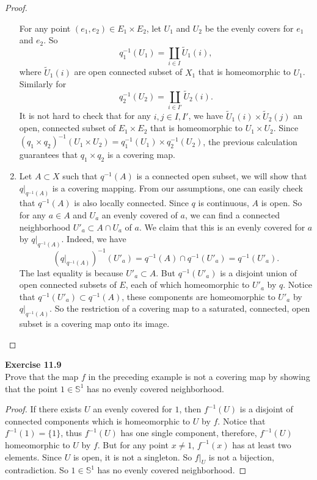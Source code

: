 \documentclass[12pt, a4paper]{article}
\theoremstyle{plain}
\newcommand{\mS}{\mathbb{S}}
\def\tilde{\widetilde}
\newenvironment{exercise}[2][Exercise]
    { \begin{mdframed}[backgroundcolor=gray!20] \textbf{#1 #2} \\}
    {  \end{mdframed}}
\begin{document}
\begin{proof}
\begin{enumerate}[label=(\alph*)]
        For any point $(e_1,e_2)\in E_1\times E_2$, let $U_1$ and $U_2$ be the evenly covers for $e_1$ and $e_2$. So
        \[
        q^{-1}_1(U_1) = \coprod_{i\in I} \tilde U_1(i),
        \]
        where $\tilde U_1(i)$ are open connected subset of $X_1$ that is homeomorphic to $U_1$. Similarly for
        \[
        q_2^{-1}(U_2) = \coprod_{i\in I'} \tilde U_2(i).
        \]
        It is not hard to check that for any $i,j\in I,I'$, we have $\tilde U_1(i)\times \tilde U_2(j)$ an open, connected subset of $E_1\times E_2$ that is homeomorphic to $U_1\times U_2$. Since $(q_1\times q_2)^{-1}(U_1\times U_2) = q_1^{-1}(U_1)\times q_2^{-1}(U_2)$, the previous calculation guarantees that $q_1\times q_2$ is a covering map.
        \item Let $A\subset X$ such that $q^{-1}(A)$ is a connected open subset, we will show that $q|_{q^{-1}(A)}$ is a covering mapping. From our assumptions, one can easily check that $q^{-1}(A)$ is also locally connected. Since $q$ is continuous, $A$ is open. So for any $a\in A$ and $U_a$ an evenly covered of $a$, we can find a connected neighborhood $U'_a\subset A\cap U_a$ of $a$. We claim that this is an evenly covered for $a$ by $q|_{q^{-1}(A)}$. Indeed, we have
        \[
        \left(q|_{q^{-1}(A)} \right)^{-1}(U'_a) = q^{-1}(A)\cap q^{-1}(U'_a) = q^{-1}(U'_a).
        \]
        The last equality is because $U'_a\subset A$. But $q^{-1}(U'_a)$ is a disjoint union of open connected subsets of $E$, each of which homeomorphic to $U'_a$ by $q$. Notice that $q^{-1}(U'_a)\subset q^{-1}(A)$, these components are homeomorphic to $U'_a$ by $q|_{q^{-1}(A)}$. So the restriction of a covering map to a saturated, connected, open subset is a covering map onto its image.
        
    \end{enumerate}
    
    \end{proof}

\begin{exercise}{11.9}
    Prove that the map $f$ in the preceding example is not a covering map by showing that the point $1\in\mS^1$ has no evenly covered neighborhood.
\end{exercise}
    \begin{proof}
        If there exists $U$ an evenly covered for $1$, then $f^{-1}(U)$ is a disjoint of connected components which is homeomorphic to $U$ by $f$. Notice that $f^{-1}(1) = \{1\}$, thus $f^{-1}(U)$ has one single component, therefore, $f^{-1}(U)$ homeomorphic to $U$ by $f$. But for any point $x\neq 1$, $f^{-1}(x)$ has at least two elements. Since $U$ is open, it is not a singleton. So $f|_U$ is not a bijection, contradiction. So $1\in\mS^1$ has no evenly covered neighborhood.
    \end{proof}
\end{document}
